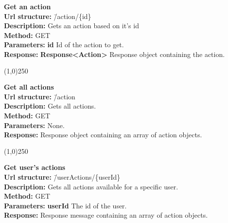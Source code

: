 \documentclass[11pt]{article}
\begin{document}
\begin{tabbing}
\textbf{Get an action} \\
\textcolor{black!60}{\textbf{Url structure:}} \hspace{0.2in} \= /action/\{id\} \\
\textcolor{black!60}{\textbf{Description:}}  \> Gets an action based on it's id \\
\textcolor{black!60}{\textbf{Method:}} \> GET \\
\textcolor{black!60}{\textbf{Parameters:}} \> \textbf{id} Id of the action to get. \\
\textcolor{black!60}{\textbf{Response:}} \> \textbf{Response<Action>} Response object containing the action.
\end{tabbing}

\begin{center}\line(1,0){250}\end{center}

\begin{tabbing}
\textbf{Get all actions} \\
\textcolor{black!60}{\textbf{Url structure:}} \hspace{0.2in} \= /action \\
\textcolor{black!60}{\textbf{Description:}}  \> Gets all actions. \\
\textcolor{black!60}{\textbf{Method:}} \> GET \\
\textcolor{black!60}{\textbf{Parameters:}} \> None. \\
\textcolor{black!60}{\textbf{Response:}} \> Response object containing an array of action objects.
\end{tabbing}

\begin{center}\line(1,0){250}\end{center}

\begin{tabbing}
\textbf{Get user's actions} \\
\textcolor{black!60}{\textbf{Url structure:}} \hspace{0.2in} \= /userActions/\{userId\} \\
\textcolor{black!60}{\textbf{Description:}}  \> Gets all actions available for a specific user. \\
\textcolor{black!60}{\textbf{Method:}} \> GET \\
\textcolor{black!60}{\textbf{Parameters:}} \> \textbf{userId} The id of the user. \\
\textcolor{black!60}{\textbf{Response:}} \> Response message containing an array of action objects.
\end{tabbing}
\end{document}
